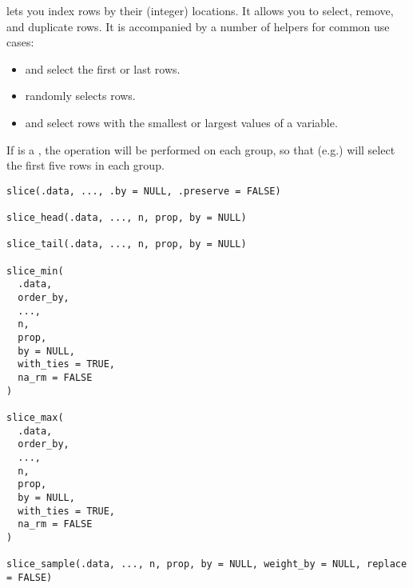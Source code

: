 \documentclass[a4paper]{book}
\begin{document}
%
\begin{Description}
 lets you index rows by their (integer) locations. It allows you
to select, remove, and duplicate rows. It is accompanied by a number of
helpers for common use cases:
\begin{itemize}

\item{}  and  select the first or last rows.
\item{}  randomly selects rows.
\item{}  and  select rows with the smallest or largest
values of a variable.

\end{itemize}


If  is a , the operation will be performed on each group,
so that (e.g.)  will select the first five rows in
each group.
\end{Description}
%
\begin{Usage}
\begin{verbatim}
slice(.data, ..., .by = NULL, .preserve = FALSE)

slice_head(.data, ..., n, prop, by = NULL)

slice_tail(.data, ..., n, prop, by = NULL)

slice_min(
  .data,
  order_by,
  ...,
  n,
  prop,
  by = NULL,
  with_ties = TRUE,
  na_rm = FALSE
)

slice_max(
  .data,
  order_by,
  ...,
  n,
  prop,
  by = NULL,
  with_ties = TRUE,
  na_rm = FALSE
)

slice_sample(.data, ..., n, prop, by = NULL, weight_by = NULL, replace = FALSE)
\end{verbatim}
\end{Usage}
%
\end{document}
